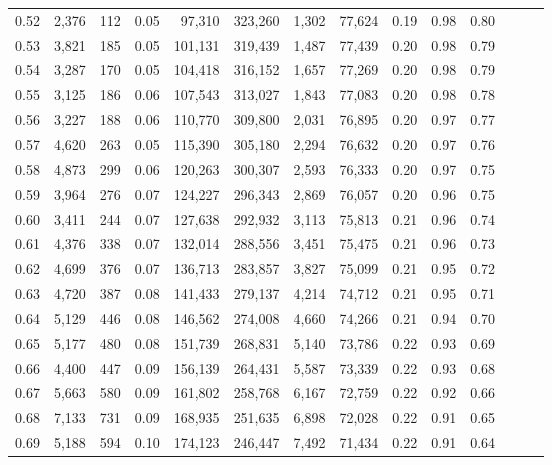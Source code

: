 \begin{tabular}{rrrrrrrrrrrrrr}
0.52 &   2,376 &    112 &  0.05 &   97,310 &  323,260 &   1,302 &  77,624 &  0.19 &  0.98 &      0.80 \\
0.53 &   3,821 &    185 &  0.05 &  101,131 &  319,439 &   1,487 &  77,439 &  0.20 &  0.98 &      0.79 \\
0.54 &   3,287 &    170 &  0.05 &  104,418 &  316,152 &   1,657 &  77,269 &  0.20 &  0.98 &      0.79 \\
0.55 &   3,125 &    186 &  0.06 &  107,543 &  313,027 &   1,843 &  77,083 &  0.20 &  0.98 &      0.78 \\
0.56 &   3,227 &    188 &  0.06 &  110,770 &  309,800 &   2,031 &  76,895 &  0.20 &  0.97 &      0.77 \\
0.57 &   4,620 &    263 &  0.05 &  115,390 &  305,180 &   2,294 &  76,632 &  0.20 &  0.97 &      0.76 \\
0.58 &   4,873 &    299 &  0.06 &  120,263 &  300,307 &   2,593 &  76,333 &  0.20 &  0.97 &      0.75 \\
0.59 &   3,964 &    276 &  0.07 &  124,227 &  296,343 &   2,869 &  76,057 &  0.20 &  0.96 &      0.75 \\
0.60 &   3,411 &    244 &  0.07 &  127,638 &  292,932 &   3,113 &  75,813 &  0.21 &  0.96 &      0.74 \\
0.61 &   4,376 &    338 &  0.07 &  132,014 &  288,556 &   3,451 &  75,475 &  0.21 &  0.96 &      0.73 \\
0.62 &   4,699 &    376 &  0.07 &  136,713 &  283,857 &   3,827 &  75,099 &  0.21 &  0.95 &      0.72 \\
0.63 &   4,720 &    387 &  0.08 &  141,433 &  279,137 &   4,214 &  74,712 &  0.21 &  0.95 &      0.71 \\
0.64 &   5,129 &    446 &  0.08 &  146,562 &  274,008 &   4,660 &  74,266 &  0.21 &  0.94 &      0.70 \\
0.65 &   5,177 &    480 &  0.08 &  151,739 &  268,831 &   5,140 &  73,786 &  0.22 &  0.93 &      0.69 \\
0.66 &   4,400 &    447 &  0.09 &  156,139 &  264,431 &   5,587 &  73,339 &  0.22 &  0.93 &      0.68 \\
0.67 &   5,663 &    580 &  0.09 &  161,802 &  258,768 &   6,167 &  72,759 &  0.22 &  0.92 &      0.66 \\
0.68 &   7,133 &    731 &  0.09 &  168,935 &  251,635 &   6,898 &  72,028 &  0.22 &  0.91 &      0.65 \\
0.69 &   5,188 &    594 &  0.10 &  174,123 &  246,447 &   7,492 &  71,434 &  0.22 &  0.91 &      0.64 \\

\end{tabular}
